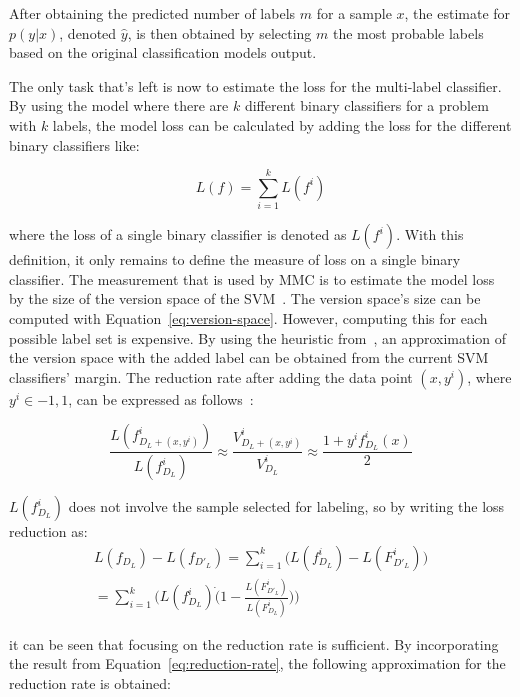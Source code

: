 After obtaining the predicted number of labels $m$ for a sample $x$, the estimate for $p(y|x)$, denoted $\hat{y}$, is then obtained by selecting $m$ the most probable labels based on the original classification models output.

The only task that's left is now to estimate the loss for the multi-label classifier.
By using the model where there are $k$ different binary classifiers for a problem with $k$ labels, the model loss can be calculated by adding the loss for the different binary classifiers like:

\begin{equation}
    L(f) = \sum_{i = 1}^k L(f^i)
\end{equation}

where the loss of a single binary classifier is denoted as $L(f^i)$.
With this definition, it only remains to define the measure of loss on a single binary classifier.
The measurement that is used by MMC is to estimate the model loss by the size of the version space of the SVM~\cite{tong2001support, yang2009effective}.
The version space's size can be computed with Equation~\ref{eq:version-space}.
However, computing this for each possible label set is expensive.
By using the heuristic from~\cite{tong2001active}, an approximation of the version space with the added label can be obtained from the current SVM classifiers' margin.
The reduction rate after adding the data point $(x, y^i)$, where $y^i \in {-1, 1}$, can be expressed as follows~\cite{yang2009effective, tong2001active}:

\begin{equation}\label{eq:reduction-rate}
    \frac{L(f^i_{D_L+(x, y^i)})}{L(f^i_{D_L})} \approx \frac{V^i_{D_L + (x, y^i)}}{V^i_{D_L}} \approx \frac{1 + y^i f^i_{D_L}(x)}{2}
\end{equation}

$L(f^i_{D_L})$ does not involve the sample selected for labeling, so by writing the loss reduction as:
\begin{equation}
    \begin{split}
        L(f_{D_L}) - L(f_{D'_L}) = \sum_{i=1}^k\big ( L(f^i_{D_L}) - L(F^i_{D'_L}) \big )\\
        = \sum_{i=1}^k\big ( L(f^i_{D_L}) \dot (1 - \frac{L(F^i_{D'_L})}{L(F^i_{D_L})}) \big )
    \end{split}
\end{equation}

it can be seen that focusing on the reduction rate is sufficient.
By incorporating the result from Equation~\ref{eq:reduction-rate}, the following approximation for the reduction rate is obtained:


